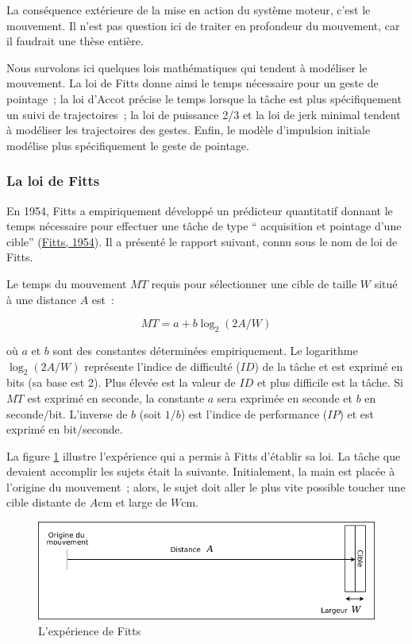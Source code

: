 \documentclass[
]{book}
\begin{document}
La conséquence extérieure de la mise en action du système moteur, c'est le
mouvement. Il n'est pas question ici de traiter en profondeur du mouvement,
car il faudrait une thèse entière.

Nous survolons ici quelques lois mathématiques qui tendent à modéliser le
mouvement. La loi de Fitts donne ainsi le temps nécessaire pour un geste de
pointage~; la loi d'Accot précise le temps lorsque la tâche est plus
spécifiquement un suivi de trajectoires~; la loi de puissance 2/3 et la loi de
jerk minimal tendent à modéliser les trajectoires des gestes. Enfin, le
modèle d'impulsion initiale modélise plus spécifiquement le geste de
pointage.

\hypertarget{fitts}{%
\subsubsection{La loi de Fitts}\label{fitts}}

En 1954, Fitts a empiriquement développé un prédicteur quantitatif donnant
le temps nécessaire pour effectuer une tâche de type `` acquisition et
pointage d'une cible'' (\protect\hyperlink{ref-fitts1954information}{Fitts, 1954}). Il a
présenté le rapport suivant, connu sous le nom de loi de Fitts.

Le temps du mouvement \(MT\) requis pour
sélectionner une cible de taille \(W\) situé à une
distance \(A\) est~:

\begin{equation}
 MT=a+b\log_{2}(2A/W)
 \label{eq:fitts}
\end{equation}

où \(a\) et \(b\) sont des
constantes déterminées empiriquement. Le logarithme \(\log_{2}(2A/W)\)
représente l'indice de difficulté (\(ID\)) de la
tâche et est exprimé en bits (sa base est 2). Plus élevée est la valeur de
\(ID\) et plus difficile est la tâche. Si
\(MT\) est exprimé en seconde, la constante
\(a\) sera exprimée en seconde et \(b\) en seconde/bit. L'inverse de \(b\)
(soit \(1/b\)) est l'indice de performance
(\(IP\)) et est exprimé en bit/seconde.

La figure \ref{fig:LexperiencedeFitts} illustre
l'expérience qui a permis à Fitts d'établir sa loi. La tâche que devaient
accomplir les sujets était la suivante. Initialement, la main est placée à
l'origine du mouvement~; alors, le sujet doit aller le plus vite possible
toucher une cible distante de \(A\)cm et large de
\(W\)cm.

\begin{figure}
\centering
\includegraphics{img/fitts.png}
\caption{\label{fig:LexperiencedeFitts}L'expérience de Fitts}
\end{figure}
\end{document}
